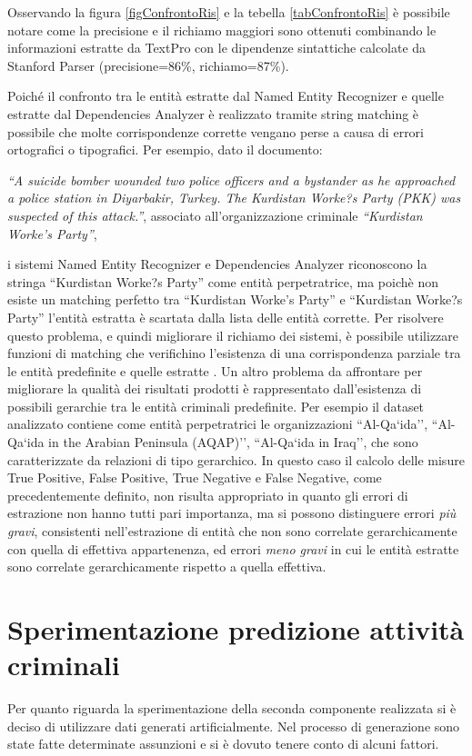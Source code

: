 Osservando la figura \ref{figConfrontoRis} e la tebella \ref{tabConfrontoRis} è possibile notare come la precisione e il richiamo maggiori sono ottenuti combinando le informazioni estratte da TextPro con le dipendenze sintattiche calcolate da Stanford Parser (precisione=86\%, richiamo=87\%).

Poiché il confronto tra le entità estratte dal Named Entity Recognizer e quelle estratte dal Dependencies Analyzer è realizzato tramite string matching è possibile che molte corrispondenze corrette vengano perse a causa di errori ortografici o tipografici.
Per esempio, dato il documento:

\textit{``A suicide bomber wounded two police officers and a bystander as he approached a police station in Diyarbakir, Turkey. The Kurdistan Worke?s Party (PKK) was suspected of this attack.''}, associato all'organizzazione criminale \textit{``Kurdistan Worke's Party''},

i sistemi Named Entity Recognizer e Dependencies Analyzer riconoscono la stringa ``Kurdistan Worke?s Party'' come entità perpetratrice, ma poichè non esiste un matching perfetto tra ``Kurdistan Worke's Party'' e ``Kurdistan Worke?s Party'' l'entità estratta è scartata dalla lista delle entità corrette.
Per risolvere questo problema, e quindi migliorare il richiamo dei sistemi, è possibile utilizzare funzioni di matching che verifichino l'esistenza di una corrispondenza parziale tra le entità predefinite e quelle estratte \cite{Deng12}.
Un altro problema da affrontare per migliorare la qualità dei risultati prodotti è rappresentato dall'esistenza di possibili gerarchie tra le entità criminali predefinite. 
Per esempio il dataset analizzato contiene come entità perpetratrici le organizzazioni ``Al-Qa`ida'', ``Al-Qa`ida in the Arabian Peninsula (AQAP)'', ``Al-Qa`ida in Iraq'', che sono caratterizzate da relazioni di tipo gerarchico. In questo caso il calcolo delle misure True Positive, False Positive, True Negative e False Negative, come precedentemente definito, non risulta appropriato in quanto gli errori di estrazione non hanno tutti pari importanza, ma  si possono distinguere errori \textit{più gravi}, consistenti  nell'estrazione di entità che non sono correlate gerarchicamente con quella di effettiva appartenenza, ed errori \textit{meno gravi} in cui le entità estratte sono correlate gerarchicamente rispetto a quella effettiva.

\section{Sperimentazione predizione attività criminali}
Per quanto riguarda la sperimentazione della seconda componente realizzata si è deciso di utilizzare dati generati artificialmente. Nel processo di generazione sono state fatte determinate assunzioni e si è dovuto tenere conto di alcuni fattori. 

